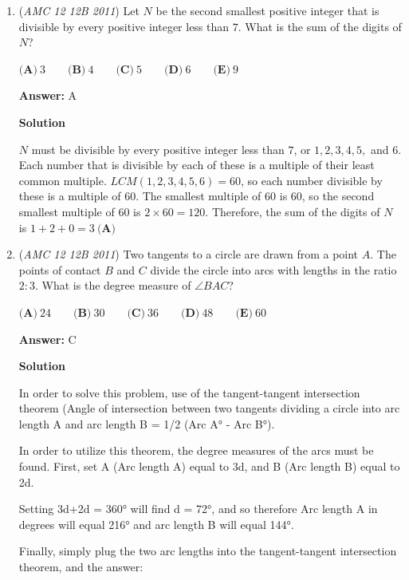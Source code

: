 \begin{enumerate}
 \[= \boxed{224 \textbf{(E)}}\]



	\item (\textit{AMC 12 12B 2011}) Let $N$ be the second smallest positive integer that is divisible by every positive integer less than $7$.  What is the sum of the digits of $N$?


 $\textbf{(A)}\ 3 \qquad \textbf{(B)}\ 4 \qquad \textbf{(C)}\ 5 \qquad \textbf{(D)}\ 6 \qquad \textbf{(E)}\ 9$

 \textbf{Answer: }A



\textbf{Solution}

$N$ must be divisible by every positive integer less than $7$, or $1, 2, 3, 4, 5,$ and $6$. Each number that is divisible by each of these is a multiple of their least common multiple. $LCM(1,2,3,4,5,6)=60$, so each number divisible by these is a multiple of $60$. The smallest multiple of $60$ is $60$, so the second smallest multiple of $60$ is $2\times60=120$. Therefore, the sum of the digits of $N$ is $1+2+0=\boxed{3\ \textbf{(A)}}$



	\item (\textit{AMC 12 12B 2011}) Two tangents to a circle are drawn from a point $A$.  The points of contact $B$ and $C$ divide the circle into arcs with lengths in the ratio $2 : 3$.  What is the degree measure of $\angle{BAC}$?


 $\textbf{(A)}\ 24 \qquad \textbf{(B)}\ 30 \qquad \textbf{(C)}\ 36 \qquad \textbf{(D)}\ 48 \qquad \textbf{(E)}\ 60$

 \textbf{Answer: }C



\textbf{Solution}

In order to solve this problem, use of the tangent-tangent intersection theorem (Angle of intersection between two tangents dividing a circle into arc length A and arc length B = 1/2 (Arc A° - Arc B°).

 In order to utilize this theorem, the degree measures of the arcs must be found.  First, set A (Arc length A) equal to 3d, and B (Arc length B) equal to 2d.  

 Setting 3d+2d = 360° will find d = 72°, and so therefore Arc length A in degrees will equal 216° and arc length B will equal 144°.

 Finally, simply plug the two arc lengths into the tangent-tangent intersection theorem, and the answer:


\end{enumerate}
